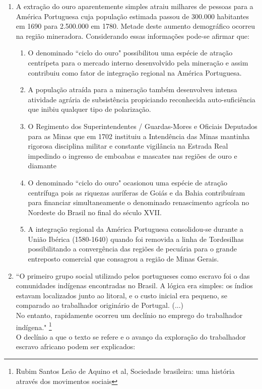\documentclass[10pt,a4paper]{article}
\begin{document}
\begin{multicols}{2}
\begin{enumerate}
	\item A extra\c{c}\~ao do ouro aparentemente simples atraiu milhares de pessoas para a Am\'erica Portuguesa cuja popula\c{c}\~ao estimada passou de 300.000 habitantes em 1690 para 2.500.000 em 1780. Metade deste aumento demogr\'afico ocorreu na regi\~ao mineradora. Considerando essas informa\c{c}\~oes pode-se afirmar que:

		\begin{enumerate}
		\item O denominado ``ciclo do ouro" possibilitou uma esp\'ecie de atra\c{c}\~ao centr\'ipeta para o mercado interno desenvolvido pela minera\c{c}\~ao e assim contribuiu como fator de integra\c{c}\~ao regional na Am\'erica Portuguesa.  
		\item A popula\c{c}\~ao atra\'ida para a minera\c{c}\~ao tamb\'em desenvolveu intensa atividade agr\'aria de subsist\^encia propiciando reconhecida auto-sufici\^encia que inibiu qualquer tipo de polariza\c{c}\~ao.  
		\item O Regimento dos Superintendentes / Guardas-Mores e Oficiais Deputados para as Minas que em 1702 instituiu a Intend\^encia das Minas mantinha rigorosa disciplina militar e constante vigilância na Estrada Real impedindo o ingresso de emboabas e mascates nas regi\~oes de ouro e diamante
		\item O denominado ``ciclo do ouro" ocasionou uma esp\'ecie de atra\c{c}\~ao centr\'ifuga pois as riquezas aur\'iferas de Goi\'as e da Bahia contribu\'iram para financiar simultaneamente o denominado renascimento agr\'icola no Nordeste do Brasil no final do s\'eculo XVII. 
		\item A integra\c{c}\~ao regional da Am\'erica Portuguesa consolidou-se durante a Uni\~ao Ib\'erica (1580-1640) quando foi removida a linha de Tordesilhas possibilitando a converg\^encia das regi\~oes de pecu\'aria para o grande entreposto comercial que consagrou a regi\~ao de Minas Gerais.
		\end{enumerate}

	\item ``O primeiro grupo social utilizado pelos portugueses como escravo foi o das comunidades ind\'igenas encontradas no Brasil. A l\'ogica era simples: os \'indios estavam localizados junto ao litoral, e o custo inicial era pequeno, se comparado ao trabalhador origin\'ario de Portugal. (...) \\
No entanto, rapidamente ocorreu um decl\'inio no emprego do trabalhador ind\'igena." \footnote{Rubim Santos Le\~ao de Aquino et al, Sociedade brasileira: uma hist\'oria atrav\'es dos movimentos sociais} \\
	O decl\'inio a que o texto se refere e o avan\c{c}o da explora\c{c}\~ao do trabalhador escravo africano podem ser explicados: 


\end{enumerate}
\end{multicols}
\end{document}
